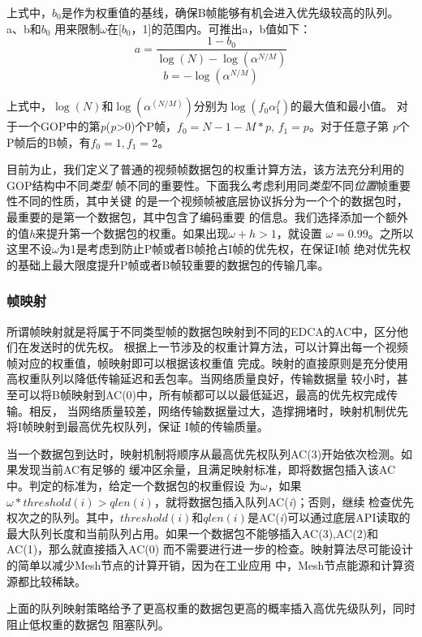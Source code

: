 上式中，$b_{0}$是作为权重值的基线，确保B帧能够有机会进入优先级较高的队列。a、b和$b_{0}$
用来限制$\omega$在[$b_{0}$，1]的范围内。可推出a，b值如下：
$$ a = \frac{1-b_{0}}{\log(N) - \log(\alpha^{N/M})} $$
$$ b = -\log(\alpha^{N/M}) $$

上式中，$\log(N)$和$\log(\alpha^(N/M))$分别为$\log(f_{0}\alpha^f_{1})$的最大值和最小值。
对于一个GOP中的第\emph{p}(\emph{p}>0)个P帧，$f_{0}=N-1-M*p$, $f_{1}=p$。对于任意子第
\emph{p}个P帧后的B帧，有$f_{0}=1, f_{1}=2$。

目前为止，我们定义了普通的视频帧数据包的权重计算方法，该方法充分利用的GOP结构中不同\emph{类型}
帧不同的重要性。下面我么考虑利用同\emph{类型}不同\emph{位置}帧重要性不同的性质，其中关键
的是一个视频帧被底层协议拆分为一个个的数据包时，最重要的是第一个数据包，其中包含了编码重要
的信息。我们选择添加一个额外的值\emph{h}来提升第一个数据包的权重。如果出现$\omega+h>1$，就设置
$\omega=0.99$。之所以这里不设$\omega$为1是考虑到防止P帧或者B帧抢占I帧的优先权，在保证I帧
绝对优先权的基础上最大限度提升P帧或者B帧较重要的数据包的传输几率。

\subsubsection{帧映射}
所谓帧映射就是将属于不同类型帧的数据包映射到不同的EDCA的AC中，区分他们在发送时的优先权。
根据上一节涉及的权重计算方法，可以计算出每一个视频帧对应的权重值，帧映射即可以根据该权重值
完成。映射的直接原则是充分使用高权重队列以降低传输延迟和丢包率。当网络质量良好，传输数据量
较小时，甚至可以将B帧映射到AC(0)中，所有帧都可以以最低延迟，最高的优先权完成传输。相反，
当网络质量较差，网络传输数据量过大，造撑拥堵时，映射机制优先将I帧映射到最高优先权队列，保证
I帧的传输质量。

当一个数据包到达时，映射机制将顺序从最高优先权队列AC(3)开始依次检测。如果发现当前AC有足够的
缓冲区余量，且满足映射标准，即将数据包插入该AC中。判定的标准为，给定一个数据包的权重假设
为$\omega$，如果$\omega*threshold(i)>qlen(i)$，就将数据包插入队列AC(\emph{i})；否则，继续
检查优先权次之的队列。其中，$threshold(i)$和$qlen(i)$是AC(\emph{i})可以通过底层API读取的
最大队列长度和当前队列占用。如果一个数据包不能够插入AC(3),AC(2)和AC(1)，那么就直接插入AC(0)
而不需要进行进一步的检查。映射算法尽可能设计的简单以减少Mesh节点的计算开销，因为在工业应用
中，Mesh节点能源和计算资源都比较稀缺。

上面的队列映射策略给予了更高权重的数据包更高的概率插入高优先级队列，同时阻止低权重的数据包
阻塞队列。

